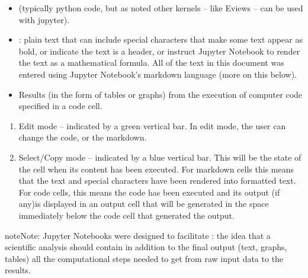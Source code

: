 \documentclass[letterpaper,10pt,english]{jupyterBook}
\begin{document}
\sphinxAtStartPar
{}
\begin{itemize}
\item {} 
\sphinxAtStartPar
{} (typically python code, but as noted other kernels – like Eviews – can be used with jupyter).

\item {} 
\sphinxAtStartPar
{}: plain text that can include special characters that make some text appear as bold, or indicate the text is a header, or instruct Jupyter Notebook to render the text as a mathematical formula.  All of the text in this document was entered using Jupyter Notebook’s markdown language (more on this below).

\item {} 
\sphinxAtStartPar
Results (in the form of tables or graphs) from the execution of computer code specified in a code cell.

\end{itemize}

\sphinxAtStartPar
{}
\begin{enumerate}
%
\item {} 
\sphinxAtStartPar
Edit mode – indicated by a green vertical bar. In edit mode, the user can change the code, or the markdown.

\item {} 
\sphinxAtStartPar
Select/Copy mode – indicated by a blue vertical bar.  This will be the state of the cell when its content has been executed.  For markdown cells this means that the text and special characters have been rendered into formatted text.  For code cells, this means the code has been executed and its output (if any)is displayed in an output cell that will be generated in the space immediately below the code cell that generated the output.

\end{enumerate}

\sphinxAtStartPar
{}

\begin{sphinxadmonition}{note}{Note:}
\sphinxAtStartPar
Jupyter Notebooks were designed to facilitate : the idea that a scientific analysis should contain \sphinxhyphen{} in addition to the final output (text, graphs, tables) \sphinxhyphen{} all the computational steps needed to get from raw input data to the results.
\end{sphinxadmonition}
\end{document}
